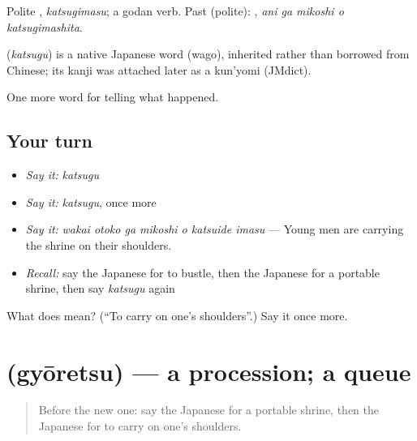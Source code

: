 Polite \textbf{}, \emph{katsugimasu}; a godan verb. Past (polite): \textbf{  }, \emph{ani ga mikoshi o katsugimashita}.

\begin{cousinweb}
\textbf{} (\emph{katsugu}) is a native Japanese word (wago), inherited rather than borrowed from Chinese; its kanji was attached later as a kun'yomi (JMdict).
\end{cousinweb}

\begin{grammarlens}[title={What you've built}]
One more word for telling what happened.
\end{grammarlens}

\subsection*{Your turn}
\begin{itemize}
\raggedright
  \item \emph{Say it:} \emph{katsugu}
  \item \emph{Say it:} \emph{katsugu}, once more
  \item \emph{Say it:} \emph{wakai otoko ga mikoshi o katsuide imasu} — Young men are carrying the shrine on their shoulders.
  \item \emph{Recall:} say the Japanese for to bustle, then the Japanese for a portable shrine, then say \emph{katsugu} again
\end{itemize}

\begin{tcolorbox}[breakable,colback=teal!4,colframe=teal!35!black,title={Before you move on}]
What does  mean? (\textquotedblleft{}To carry on one's shoulders\textquotedblright{}.) Say it once more.
\end{tcolorbox}
\section[\texorpdfstring{\ja{ぎょうれつ} (gyōretsu)}{ぎょうれつ (gyōretsu)}]{ (gyōretsu) — a procession; a queue}

\label{lesson:JA-C294-gyouretsu}



\begin{quote}
Before the new one: say the Japanese for a portable shrine, then the Japanese for to carry on one's shoulders.
\end{quote}

